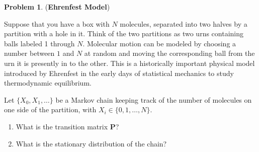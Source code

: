 \documentclass[11pt]{article}
\theoremstyle{definition}
\newtheorem{prob}[theo]{\color{Maroon} Problem}
\theoremstyle{remark}
\begin{document}
\begin{prob} (\textbf{Ehrenfest Model})

Suppose that you have a box with $N$ molecules, separated into two halves by a partition with a hole in it. Think of the two partitions as two urns containing balls labeled 1 through $N$. Molecular motion can be modeled by choosing a number between $1$ and $N$ at random and moving the corresponding ball from the urn it is presently in to the other. This is a historically important physical model introduced by Ehrenfest in the early days of statistical mechanics to study thermodynamic equilibrium.  

Let $\{X_0, X_1, \ldots\}$ be a Markov chain keeping track of the number of molecules on one side of the partition, with $X_i \in \{0,1,\ldots,N\}$. 

\begin{enumerate}[label = (\alph*)]
    \item What is the transition matrix $\bm{P}$?
    
    

    \item What is the stationary distribution of the chain?
    
\end{enumerate}
\end{prob}
\end{document}
